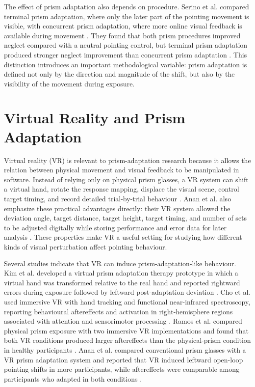The effect of prism adaptation also depends on procedure. Serino et al. compared terminal prism adaptation, where only the later part of the pointing movement is visible, with concurrent prism adaptation, where more online visual feedback is available during movement \cite{Serino2011}. They found that both prism procedures improved neglect compared with a neutral pointing control, but terminal prism adaptation produced stronger neglect improvement than concurrent prism adaptation \cite{Serino2011}. This distinction introduces an important methodological variable: prism adaptation is defined not only by the direction and magnitude of the shift, but also by the visibility of the movement during exposure.

\section{Virtual Reality and Prism Adaptation}
\label{sec:background-vr-pa}

Virtual reality (VR) is relevant to prism-adaptation research because it allows the relation between physical movement and visual feedback to be manipulated in software. Instead of relying only on physical prism glasses, a VR system can shift a virtual hand, rotate the response mapping, displace the visual scene, control target timing, and record detailed trial-by-trial behaviour \cite{kim2017development,cho2022feasibility,Ramos2019,anan2025comparative}. Anan et al. also emphasize these practical advantages directly: their VR system allowed the deviation angle, target distance, target height, target timing, and number of sets to be adjusted digitally while storing performance and error data for later analysis \cite{anan2025comparative}. These properties make VR a useful setting for studying how different kinds of visual perturbation affect pointing behaviour.

Several studies indicate that VR can induce prism-adaptation-like behaviour. Kim et al. developed a virtual prism adaptation therapy prototype in which a virtual hand was transformed relative to the real hand and reported rightward errors during exposure followed by leftward post-adaptation deviation \cite{kim2017development}. Cho et al. used immersive VR with hand tracking and functional near-infrared spectroscopy, reporting behavioural aftereffects and activation in right-hemisphere regions associated with attention and sensorimotor processing \cite{cho2022feasibility}. Ramos et al. compared physical prism exposure with two immersive VR implementations and found that both VR conditions produced larger aftereffects than the physical-prism condition in healthy participants \cite{Ramos2019}. Anan et al. compared conventional prism glasses with a VR prism adaptation system and reported that VR induced leftward open-loop pointing shifts in more participants, while aftereffects were comparable among participants who adapted in both conditions \cite{anan2025comparative}.

